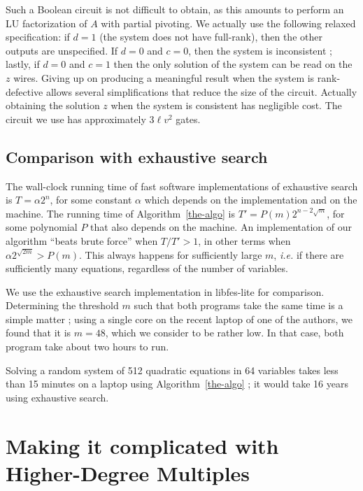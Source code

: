 \documentclass[a4paper,UKenglish,cleveref, autoref]{lipics-v2019}
\begin{document}
Such a Boolean circuit is not difficult to obtain, as this amounts to perform an
LU factorization of $A$ with partial pivoting.  We actually use the following
relaxed specification: if $d=1$ (the system does not have full-rank), then the
other outputs are unspecified. If $d=0$ and $c=0$, then the system is
inconsistent ; lastly, if $d=0$ and $c=1$ then the only solution of the system
can be read on the $z$ wires. Giving up on producing a meaningful result when
the system is rank-defective allows several simplifications that reduce the size
of the circuit. Actually obtaining the solution $z$ when the system is
consistent has negligible cost. The circuit we use has approximately $3\ell v^2$
gates.

\subsection{Comparison with exhaustive search}

The wall-clock running time of fast software implementations of exhaustive
search is $T = \alpha 2^n$, for some constant $\alpha$ which depends on the
implementation and on the machine. The running time of Algorithm~\ref{the-algo}
is $T' = P(m) 2^{n - 2\sqrt{m}}$, for some polynomial $P$ that also depends on
the machine. An implementation of our algorithm ``beats brute force'' when
$T/T' > 1$, in other terms when $\alpha 2^{\sqrt{2m}} > P(m)$. This always
happens for sufficiently large $m$, \textit{i.e.} if there are sufficiently many
equations, regardless of the number of variables.

We use the exhaustive search implementation in \textsf{libfes-lite} for
comparison. Determining the threshold $m$ such that both programs take the same
time is a simple matter ; using a single core on the recent laptop of one of the
authors, we found that it is $m=48$, which we consider to be rather low. In that
case, both program take about two hours to run.

Solving a random system of 512 quadratic equations in 64 variables takes less
than 15 minutes on a laptop using Algorithm~\ref{the-algo} ; it would take 16
years using exhaustive search.


\section{Making it complicated with Higher-Degree Multiples}
\label{sec:extensions}
\end{document}
